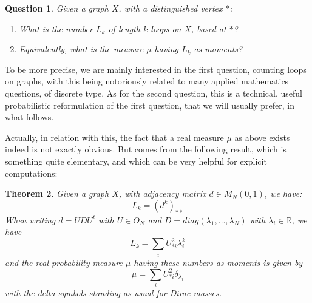 \documentclass[12pt]{amsbook}
\newtheorem{theorem}{Theorem}[chapter]
\newtheorem{question}[theorem]{Question}
\begin{document}
\begin{question}
Given a graph $X$, with a distinguished vertex $*$:
\begin{enumerate}
\item What is the number $L_k$ of length $k$ loops on $X$, based at $*$? 

\item Equivalently, what is the measure $\mu$ having $L_k$ as moments?
\end{enumerate}
\end{question}

To be more precise, we are mainly interested in the first question, counting loops on graphs, with this being notoriously related to many applied mathematics questions, of discrete type. As for the second question, this is a technical, useful probabilistic reformulation of the first question, that we will usually prefer, in what follows. 

\bigskip

Actually, in relation with this, the fact that a real measure $\mu$ as above exists indeed is not exactly obvious. But comes from the following result, which is something quite elementary, and which can be very helpful for explicit computations:


\begin{theorem}
Given a graph $X$, with adjacency matrix $d\in M_N(0,1)$, we have:
$$L_k=(d^k)_{**}$$
When writing $d=UDU^t$ with $U\in O_N$ and $D=diag(\lambda_1,\ldots,\lambda_N)$ with $\lambda_i\in\mathbb R$, we have
$$L_k=\sum_iU_{*i}^2\lambda_i^k$$
and the real probability measure $\mu$ having these numbers as moments is given by
$$\mu=\sum_iU_{*i}^2\delta_{\lambda_i}$$
with the delta symbols standing as usual for Dirac masses.
\end{theorem}
\end{document}
